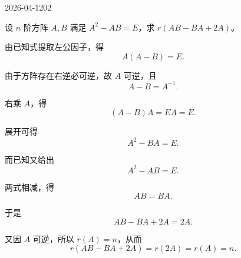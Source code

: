 \begin{mistake}{2026-04-12}{02}

\begin{problemcontent}
设 \(n\) 阶方阵 \(A,B\) 满足 \(A^2-AB=E\)，求 \(r(AB-BA+2A)\)。

\end{problemcontent}

\begin{solutioncontent}
由已知式提取左公因子，得
\[
A(A-B)=E.
\]

由于方阵存在右逆必可逆，故 \(A\) 可逆，且
\[
A-B=A^{-1}.
\]

右乘 \(A\)，得
\[
(A-B)A=EA=E.
\]

展开可得
\[
A^2-BA=E.
\]

而已知又给出
\[
A^2-AB=E.
\]

两式相减，得
\[
AB=BA.
\]

于是
\[
AB-BA+2A=2A.
\]

又因 \(A\) 可逆，所以 \(r(A)=n\)，从而
\[
r(AB-BA+2A)=r(2A)=r(A)=n.
\]

\end{solutioncontent}


\end{mistake}
